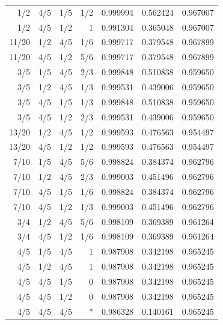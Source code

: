 \begin{longtable}{rrrrrrr}
1/2 & 4/5 & 1/5 & 1/2 & 0.999994 & 0.562424 & 0.967007\\
1/2 & 4/5 & 1/2 & 1 & 0.991304 & 0.365048 & 0.967007\\
11/20 & 1/2 & 4/5 & 1/6 & 0.999717 & 0.379548 & 0.967899\\
11/20 & 4/5 & 1/2 & 5/6 & 0.999717 & 0.379548 & 0.967899\\
3/5 & 1/5 & 4/5 & 2/3 & 0.999848 & 0.510838 & 0.959650\\
3/5 & 1/2 & 4/5 & 1/3 & 0.999531 & 0.439006 & 0.959650\\
3/5 & 4/5 & 1/5 & 1/3 & 0.999848 & 0.510838 & 0.959650\\
3/5 & 4/5 & 1/2 & 2/3 & 0.999531 & 0.439006 & 0.959650\\
13/20 & 1/2 & 4/5 & 1/2 & 0.999593 & 0.476563 & 0.954497\\
13/20 & 4/5 & 1/2 & 1/2 & 0.999593 & 0.476563 & 0.954497\\
7/10 & 1/5 & 4/5 & 5/6 & 0.998824 & 0.384374 & 0.962796\\
7/10 & 1/2 & 4/5 & 2/3 & 0.999003 & 0.451496 & 0.962796\\
7/10 & 4/5 & 1/5 & 1/6 & 0.998824 & 0.384374 & 0.962796\\
7/10 & 4/5 & 1/2 & 1/3 & 0.999003 & 0.451496 & 0.962796\\
3/4 & 1/2 & 4/5 & 5/6 & 0.998109 & 0.369389 & 0.961264\\
3/4 & 4/5 & 1/2 & 1/6 & 0.998109 & 0.369389 & 0.961264\\
4/5 & 1/5 & 4/5 & 1 & 0.987908 & 0.342198 & 0.965245\\
4/5 & 1/2 & 4/5 & 1 & 0.987908 & 0.342198 & 0.965245\\
4/5 & 4/5 & 1/5 & 0 & 0.987908 & 0.342198 & 0.965245\\
4/5 & 4/5 & 1/2 & 0 & 0.987908 & 0.342198 & 0.965245\\
4/5 & 4/5 & 4/5 & * & 0.986328 & 0.140161 & 0.965245\\
\end{longtable}
\normalsize
